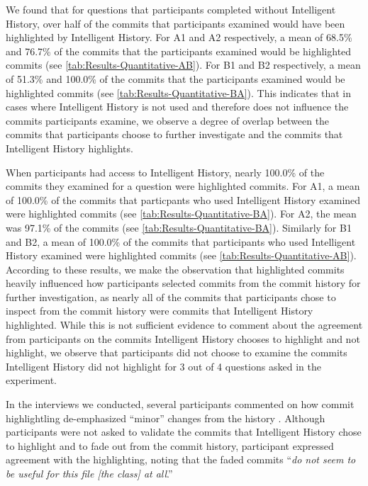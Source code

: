 We found that for questions that participants completed without Intelligent History,
over half of the commits that participants examined would have been highlighted by Intelligent History.
For A1 and A2 respectively, a mean of 68.5\% and 76.7\% 
of the commits that the participants examined would be highlighted commits (see \autoref{tab:Results-Quantitative-AB}).
For B1 and B2 respectively, a mean of 51.3\% and 100.0\% 
of the commits that the participants examined would be highlighted commits (see \autoref{tab:Results-Quantitative-BA}).
This indicates that in cases where Intelligent History is not used and therefore does not influence the commits participants examine,
we observe a degree of overlap between the commits that participants choose to further investigate and the commits that Intelligent History highlights.

When participants had access to Intelligent History,
nearly 100.0\% of the commits they examined for a question were highlighted commits.
For A1, a mean of 100.0\% of the commits that particpants who used Intelligent History examined were highlighted commits (see \autoref{tab:Results-Quantitative-BA}).
For A2, the mean was 97.1\% of the commits (see \autoref{tab:Results-Quantitative-BA}).
Similarly for B1 and B2, a mean of 100.0\% of the commits that participants who used Intelligent History examined were highlighted commits (see \autoref{tab:Results-Quantitative-AB}).
According to these results, we make the observation that highlighted commits heavily 
influenced how participants selected commits from the commit history for further investigation, as
nearly all of the commits that participants chose to inspect from the commit history were commits that Intelligent History highlighted.
While this is not sufficient evidence to comment about the agreement from participants on the commits Intelligent History
chooses to highlight and not highlight,
we observe that participants did not choose to examine the commits Intelligent History did not highlight
for 3 out of 4 questions asked in the experiment.

In the interviews we conducted, 
several participants commented on how commit highlightling de-emphasized ``minor'' changes from the history .
Although participants were not asked to validate the commits that Intelligent History chose to highlight and to fade out from the commit history, 
participant  expressed agreement with the highlighting, 
noting that the faded commits ``\textit{do not seem to be useful for this file [the  class] at all}.''

